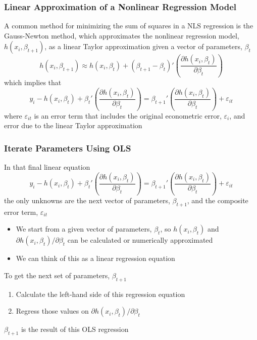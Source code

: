 \documentclass{beamer}
\begin{document}
\begin{frame}\frametitle{Linear Approximation of a Nonlinear Regression Model}
    A common method for minimizing the sum of squares in a NLS regression is the Gauss-Newton method, which approximates the nonlinear regression model, $h(x_i, \beta_{t + 1})$, as a linear Taylor approximation given a vector of parameters, $\beta_t$
    $$h(x_i, \beta_{t + 1}) \approx h(x_i, \beta_t) + (\beta_{t + 1} - \beta_t)' \left( \frac{\partial h(x_i, \beta_t)}{\partial \beta_t} \right)$$
    which implies that
    $$y_i - h(x_i, \beta_t) + \beta_t' \left( \frac{\partial h(x_i, \beta_t)}{\partial \beta_t} \right) = \beta_{t + 1}' \left( \frac{\partial h(x_i, \beta_t)}{\partial \beta_t} \right) + \varepsilon_{it}$$
    where $\varepsilon_{it}$ is an error term that includes the original econometric error, $\varepsilon_i$, and error due to the linear Taylor approximation
\end{frame}

\begin{frame}\frametitle{Iterate Parameters Using OLS}
    In that final linear equation
    $$y_i - h(x_i, \beta_t) + \beta_t' \left( \frac{\partial h(x_i, \beta_t)}{\partial \beta_t} \right) = \beta_{t + 1}' \left( \frac{\partial h(x_i, \beta_t)}{\partial \beta_t} \right) + \varepsilon_{it}$$
    the only unknowns are the next vector of parameters, $\beta_{t + 1}$, and the composite error term, $\varepsilon_{it}$
    \begin{itemize}
    	\item We start from a given vector of parameters, $\beta_t$, so $h(x_i, \beta_t)$ and $\partial h(x_i, \beta_t) / \partial \beta_t$ can be calculated or numerically approximated
    	\item We can think of this as a linear regression equation
    \end{itemize}
    \vspace{2ex}
    To get the next set of parameters, $\beta_{t + 1}$
    \begin{enumerate}
    	\item Calculate the left-hand side of this regression equation
    	\item Regress those values on $\partial h(x_i, \beta_t) / \partial \beta_t$
    \end{enumerate}
    \vspace{2ex}
    $\beta_{t + 1}$ is the result of this OLS regression
\end{frame}
\end{document}
